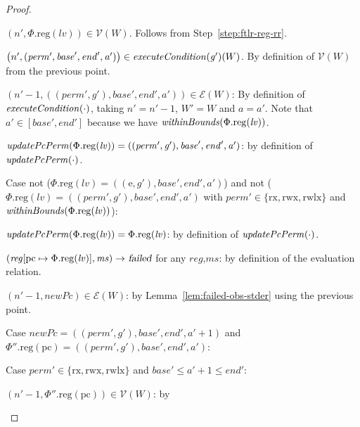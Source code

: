 \documentclass[a4paper]{article}
\newcommand{\update}[2]{[#1 \mapsto #2]}
\newcommand{\var}[1]{\mathit{#1}}
\newcommand{\hs}{\var{ms}}
\newcommand{\ms}{\hs}
\newcommand{\lv}{\var{lv}}
\newcommand{\gl}{\var{g}}
\newcommand{\pcreg}{\mathrm{pc}}
\newcommand{\addr}{\var{a}}
\newcommand{\start}{\var{base}}
\newcommand{\addrend}{\var{end}}
\newcommand{\reg}{\var{reg}}
\newcommand{\perm}{\var{perm}}
\newcommand{\plainproj}[1]{\mathrm{#1}}
\newcommand{\memreg}[1][\Phi]{#1.\plainproj{reg}}
\newcommand{\failed}{\textsl{failed}}
\newcommand{\plainfun}[2]{
  \ifthenelse{\equal{#2}{}}
  {\mathit{#1}}
  {\mathit{#1}(#2)}
}
\newcommand{\updatePcPerm}[1]{\plainfun{updatePcPerm}{#1}}
\newcommand{\withinBounds}[1]{\plainfun{withinBounds}{#1}}
\newcommand{\execCond}[1]{\plainfun{executeCondition}{#1}}
\newcommand{\asmType}{\plaindom{AsmType}}
\newcommand{\plaindom}[1]{\mathrm{#1}}
\newcommand{\intr}[2]{\mathcal{#1}}
\newcommand{\valueintr}[1]{\intr{V}{#1}}
\newcommand{\exprintr}[1]{\intr{E}{#1}}
\newcommand{\stdvr}{\valueintr{\asmType}}
\newcommand{\stder}{\exprintr{\asmType}}
\newcommand{\npair}[2][n]{\left(#1,#2 \right)}
\newcommand{\plainperm}[1]{\mathrm{#1}}
\newcommand{\exec}{\plainperm{rx}}
\newcommand{\entry}{\plainperm{e}}
\newcommand{\rwx}{\plainperm{rwx}}
\newcommand{\rwlx}{\plainperm{rwlx}}
\newcommand{\step}[1][]{\rightarrow_{#1}}
\begin{document}
\begin{proof}
\begin{enumproof}
\begin{enumproof}
\begin{enumproof}
\begin{enumproof}
          \begin{enumproof}
          \item $\npair[n']{\memreg(\lv)} \in \stdvr(W)$.  Follows from
            Step~\ref{step:ftlr-reg-rr}.
          \item $\npair[n']{(\perm',\start',\addrend',\addr')} \in \execCond{\gl'}(W)$.
            By definition of $\stdvr(W)$ from the previous point.
          \item $\npair[n'-1]{((\perm',\gl'),\start',\addrend',\addr')} \in
            \stder(W)$: By definition of $\execCond{\cdot}$, taking $n' = n'-1$,
            $W' = W$ and $\addr = \addr'$. Note that $\addr' \in
            [\start',\addrend']$ because we have $\withinBounds{\memreg(\lv)}$.
          \item $\updatePcPerm{\memreg(\lv)} =
            ((\perm',\gl'),\start',\addrend',\addr')$: by definition of
            $\updatePcPerm{\cdot}$.
          \end{enumproof}
        \item Case not ($\memreg(\lv) =
          ((\entry,\gl'),\start',\addrend',\addr')$) and not ($\memreg(\lv) =
          ((\perm',\gl'),\start',\addrend',\addr')$ with $\perm' \in
          \{\exec,\rwx,\rwlx\}$ and $\withinBounds{\memreg(\lv)}$):
          \begin{enumproof}
          \item $\updatePcPerm{\memreg(\lv)} = \memreg(\lv)$: by definition of 
            $\updatePcPerm{\cdot}$.
          \item $(\reg\update{\pcreg}{\memreg(\lv)},\ms)\step\failed$ for any
            $\reg$,$\ms$: by definition of the evaluation relation.
          \item $\npair[n'-1]{\var{newPc}} \in \stder(W)$: by
            Lemma~\ref{lem:failed-obs-stder} using the previous point.
          \end{enumproof}
        \end{enumproof}
      \item Case $\var{newPc} = ((\perm',\gl'),\start',\addrend',\addr' + 1)$ and
        $\memreg[\Phi''](\pcreg) = ((\perm',\gl'),\start',\addrend',\addr')$:
        \begin{enumproof}
        \item Case $\perm' \in \{\exec,\rwx,\rwlx\}$ and $\start'\leq
          \addr'+1\leq \addrend'$:
          \begin{enumproof}
          \item $\npair[n'-1]{\memreg[\Phi''](\pcreg)} \in \stdvr(W)$: by

\end{enumproof}
\end{enumproof}
\end{enumproof}
\end{enumproof}
\end{enumproof}
\end{proof}
\end{document}
